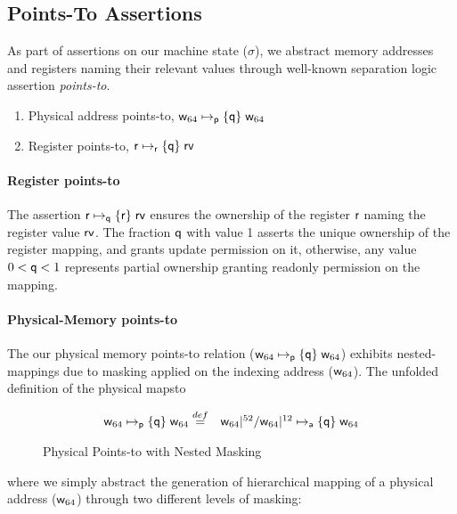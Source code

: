\subsection{Points-To Assertions}
\label{sec:pointsto}
As part of assertions on our machine state ($\sigma$), we abstract memory addresses and registers naming their relevant values through well-known separation logic assertion \textit{points-to}.
\begin{enumerate}
\item Physical address points-to, $\mathsf{w}_{64}\mapsto_{\mathsf{p}}\{\mathsf{q}\}\;\mathsf{w}_{64}$
\item Register points-to, $\mathsf{r}\mapsto_{\mathsf{r}}\{\mathsf{q}\}\;\mathsf{rv}$
\end{enumerate}
\paragraph{Register points-to} The assertion $\mathsf{r}\mapsto_{\mathsf{q}}\{\mathsf{r}\}\;\mathsf{rv}$ ensures the ownership of the register $\mathsf{r}$ naming the register value $\mathsf{rv}$. The fraction $\mathsf{q}$ with value 1 asserts the unique ownership of the register mapping, and grants update permission on it, otherwise, any value $0 < \mathsf{q} <1$ represents partial ownership granting readonly permission on the mapping.
\paragraph{Physical-Memory points-to} The our physical memory points-to relation ($\mathsf{w}_{64}\mapsto_{\mathsf{p}}\{\mathsf{q}\}\;\mathsf{w}_{64}$) exhibits nested-mappings due to masking applied on the indexing address ($\mathsf{w}_{64}$). The unfolded definition of the physical mapsto 
\begin{figure}[!ht]
\[
\begin{array}{cl}
\mathsf{w}_{64}\mapsto_{\mathsf{p}}\{\mathsf{q}\}\;\mathsf{w}_{64} \stackrel{def}{=} & \mathsf{w}_{64}|^{52} / \mathsf{w}_{64}|^{12} \mapsto_{\mathsf{a}}\{\mathsf{q}\}\;\mathsf{w}_{64}
\end{array}
\]
\caption{Physical Points-to with Nested Masking}
  \label{fig:physicalpointsto}
\end{figure}
where we simply abstract the generation of hierarchical mapping of a physical address ($\mathsf{w}_{64}$) through two different levels of masking:

